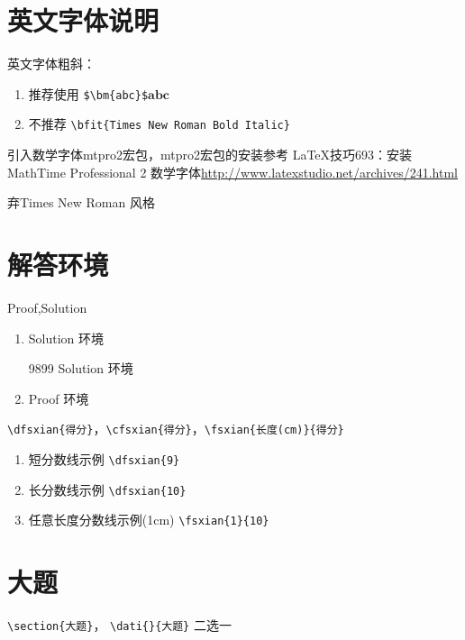 \documentclass[11pt,twoside,space]{article}
\begin{document}
\section{英文字体说明}

英文字体粗斜：
\begin{enumerate}
\item 推荐使用 \verb|$\bm{abc}$|$\bm{abc}$
\item 不推荐 \verb|\bfit{Times New Roman Bold Italic}| 
\end{enumerate}

引入数学字体mtpro2宏包，mtpro2宏包的安装参考 LaTeX技巧693：安装 MathTime Professional 2 数学字体\url{http://www.latexstudio.net/archives/241.html}

弃Times New Roman 风格

\section{解答环境}
Proof,Solution
\begin{enumerate}
\item Solution 环境
\begin{Solution}
	9899 Solution 环境
\end{Solution}
\item Proof 环境
\end{enumerate}


\verb|\dfsxian{得分}|，\verb|\cfsxian{得分}|，\verb|\fsxian{长度(cm)}{得分}|

\begin{enumerate}
\item 短分数线示例 \verb|\dfsxian{9}|
\item 长分数线示例 \verb|\dfsxian{10}|
\item 任意长度分数线示例(1cm) \verb|\fsxian{1}{10}|
\end{enumerate}


\section{大题}
\verb|\section{大题}|， \verb|\dati{}{大题}| 二选一\par
{} 
\end{document}
